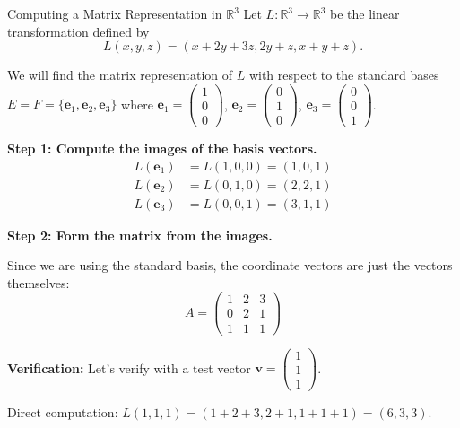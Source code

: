 \documentclass[12pt,a4paper]{article}
\newcommand{\R}{\mathbb{R}}
\newcommand{\vv}[1]{\mathbf{#1}}
\begin{document}
	\begin{example}{Computing a Matrix Representation in $\R^3$}
		Let $L: \R^3 \to \R^3$ be the linear transformation defined by
		\[
		L(x, y, z) = (x + 2y + 3z, 2y + z, x + y + z).
		\]
		
		We will find the matrix representation of $L$ with respect to the standard bases $E = F = \{\vv{e}_1, \vv{e}_2, \vv{e}_3\}$ where $\vv{e}_1 = \begin{pmatrix} 1 \\ 0 \\ 0 \end{pmatrix}$, $\vv{e}_2 = \begin{pmatrix} 0 \\ 1 \\ 0 \end{pmatrix}$, $\vv{e}_3 = \begin{pmatrix} 0 \\ 0 \\ 1 \end{pmatrix}$.
		
		\textbf{Step 1: Compute the images of the basis vectors.}
		\begin{align*}
			L(\vv{e}_1) &= L(1, 0, 0) = (1, 0, 1) \\
			L(\vv{e}_2) &= L(0, 1, 0) = (2, 2, 1) \\
			L(\vv{e}_3) &= L(0, 0, 1) = (3, 1, 1)
		\end{align*}
		
		\textbf{Step 2: Form the matrix from the images.}
		
		Since we are using the standard basis, the coordinate vectors are just the vectors themselves:
		\[
		A = \begin{pmatrix} 1 & 2 & 3 \\ 0 & 2 & 1 \\ 1 & 1 & 1 \end{pmatrix}
		\]
		
		\textbf{Verification:} Let's verify with a test vector $\vv{v} = \begin{pmatrix} 1 \\ 1 \\ 1 \end{pmatrix}$.
		
		Direct computation: $L(1, 1, 1) = (1 + 2 + 3, 2 + 1, 1 + 1 + 1) = (6, 3, 3)$.
		

\end{example}
\end{document}
